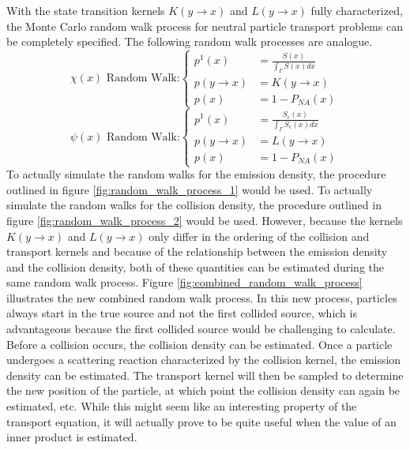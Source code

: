 With the state transition kernels $K(y \to x)$ and $L(y \to x)$ fully 
characterized, the Monte Carlo random walk process for neutral particle 
transport problems can be completely specified. The following random walk
processes are analogue.
\begin{equation}
  \chi(x)\text{ Random Walk:}
  \begin{cases}
    p^1(x) & = \frac{S(x)}{\int_{\Gamma} S(x)dx} \\
    p(y \to x) &  = K(y \to x) \\
    p(x) & = 1 - P_{NA}(x)
  \end{cases}
  \label{eq:mc_random_walk_emission_dens}
\end{equation}
\begin{equation}
  \psi(x)\text{ Random Walk:}
  \begin{cases}
    p^1(x) & = \frac{S_c(x)}{\int_{\Gamma} S_c(x)dx} \\
    p(y \to x) & = L(y \to x) \\
    p(x) & = 1 - P_{NA}(x)
  \end{cases}
  \label{eq:mc_random_walk_collision_dens}
\end{equation}
To actually simulate the random walks for the emission density, the procedure
outlined in figure \ref{fig:random_walk_process_1} would be used. To
actually simulate the random walks for the collision density, the procedure
outlined in figure \ref{fig:random_walk_process_2} would be used. However,
because the kernels $K(y \to x)$ and $L(y \to x)$ only differ in the ordering
of the collision and transport kernels and because of the relationship between
the emission density and the collision density, both of these quantities can
be estimated during the same random walk process. Figure 
\ref{fig:combined_random_walk_process} illustrates the new combined random
walk process. In this new process, particles always start in the true source
and not the first collided source, which is advantageous because the first 
collided source would be challenging to calculate. Before a collision occurs,
the collision density can be estimated. Once a particle undergoes a scattering
reaction characterized by the collision kernel, the emission density can be
estimated. The transport kernel will then be sampled to determine the new
position of the particle, at which point the collision density can again be
estimated, etc. While this might seem like an interesting property of the 
transport equation, it will actually prove to be quite useful when the value
of an inner product is estimated.

